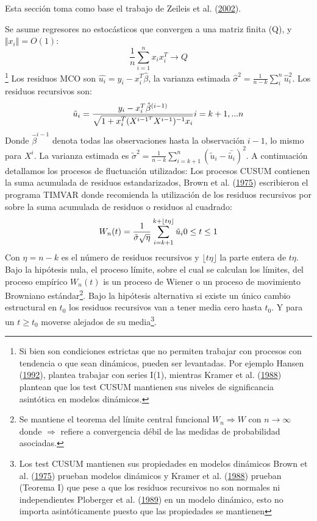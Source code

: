 \documentclass[12pt,oneside]{reedthesis}
\begin{document}
Esta sección toma como base el trabajo de Zeileis et al. (\protect\hyperlink{ref-Zeileis2002}{2002}).

Se asume regresores no estocásticos que convergen a una matriz finita (Q), y \(\Vert x_i\Vert = O(1)\):
\begin{equation}
\frac{1}{n}\sum_{i=1}^nx_ix_i^T \to Q
\end{equation}\footnote{Si bien son condiciones estrictas que no permiten trabajar con procesos con tendencia o que sean dinámicos, pueden ser levantadas. Por ejemplo Hansen (\protect\hyperlink{ref-Hansen1992}{1992}), plantea trabajar con series I(1), mientras Kramer et al. (\protect\hyperlink{ref-Society1988}{1988}) plantean que los test CUSUM mantienen sus niveles de significancia asintótica en modelos dinámicos.}
Los residuos MCO son \(\hat{u_i} = y_i - x_i^T\hat{\beta}\), la varianza estimada \(\hat{\sigma}^2 = \frac{1}{n-k}\sum_i^n\hat{u}_i^2\).
Los residuos recursivos son:
\begin{equation}
\tilde{u}_i = \frac{y_i-x_i^T\hat{\beta}^{(i-1)}}{\sqrt{1+x_i^T(X^{i-1^T}X^{i-1})^{-1}x_i}} \space\space\space\space\space\space i = k+1, ... n
\end{equation}
Donde \(\hat{\beta}^{i-1}\) denota todas las observaciones hasta la observación \(i-1\), lo mismo para \(X^i\). La varianza estimada es \(\tilde{\sigma}^2 = \frac{1}{n-k}\sum_{i=k+1}^n(\tilde{u}_i-\bar{\tilde{u_i}})^2\).
A continuación detallamos los procesos de fluctuación utilizados:
Los procesos CUSUM contienen la suma acumulada de residuos estandarizados, Brown et al. (\protect\hyperlink{ref-Brown1975}{1975}) escribieron el programa TIMVAR donde recomienda la utilización de los residuos recursivos por sobre la suma acumulada de residuos o residuos al cuadrado:
\begin{equation}
W_n(t) = \frac{1}{\tilde\sigma\sqrt \eta}\sum_{i=k+1}^{k+\lfloor t\eta\rfloor}\tilde u_i \space\space\space\space\space 0 \leq t \leq1
\end{equation}
Con \(\eta = n-k\) es el número de residuos recursivos y \(\lfloor t\eta\rfloor\) la parte entera de \(t\eta\). Bajo la hipótesis nula, el proceso límite, sobre el cual se calculan los límites, del proceso empírico \(W_n(t)\) is un proceso de Wiener o un proceso de movimiento Browniano estándar\footnote{Se mantiene el teorema del límite central funcional $W_n \Rightarrow W$ con $n \to \infty$ donde $\Rightarrow$ refiere a convergencia débil de las medidas de probabilidad asociadas.}. Bajo la hipótesis alternativa si existe un único cambio estructural en \(t_0\) los residuos recursivos van a tener media cero hasta \(t_0\). Y para un \(t \geq t_0\) moverse alejados de su media\footnote{Los test CUSUM mantienen sus propiedades en modelos dinámicos Brown et al. (\protect\hyperlink{ref-Brown1975}{1975}) prueban modelos dinámicos y Kramer et al. (\protect\hyperlink{ref-Society1988}{1988}) prueban (Teorema I) que pese a que los residuos recursivos no son normales ni independientes Ploberger et al. (\protect\hyperlink{ref-Ploberger1989}{1989}) en un modelo dinámico, esto no importa asintóticamente puesto que las propiedades se mantienen}.
\end{document}
